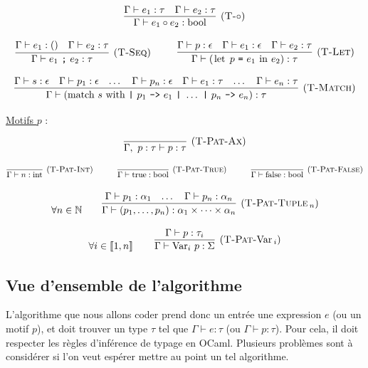 \documentclass[11pt]{article}
\begin{document}
\begin{definition}
    $$
    \infer[(\text{\scshape{T-$\circ$}})] 
    {\Gamma \vdash e_1\circ e_2:\text{bool}}
    {\Gamma \vdash e_1:\tau&\Gamma \vdash e_2:\tau}
    $$

    $$
    \infer[(\text{\scshape{T-Seq}})] 
    {\Gamma \vdash e_1~\texttt{;}~e_2:\tau}
    {\Gamma \vdash e_1:()&\Gamma\vdash e_2:\tau}
    ~~~~~~~~ 
    \infer[(\text{\scshape{T-Let}})] 
    {\Gamma \vdash (\text{\lstinline|let|}~p~\texttt{=}~e_1~\text{\lstinline|in|}~e_2):\tau}
    {
        \Gamma \vdash p:\epsilon
        &
        \Gamma \vdash e_1:\epsilon
        &
        \Gamma\vdash e_2:\tau
    }
    $$

    $$
    \infer[(\text{\scshape{T-Match}})] 
    {
        \Gamma \vdash (\text{\lstinline|match|}~s~\text{\lstinline|with|}~\texttt{|}~p_1~\texttt{->}~e_1~\texttt{|}~\dots~\texttt{|}~p_n~\texttt{->}~e_n):\tau
        }
    {
    \Gamma \vdash s:\epsilon
    &
    \Gamma \vdash p_1:\epsilon
    &
    \dots
    &
    \Gamma \vdash p_n:\epsilon
    &
    \Gamma\vdash e_1:\tau
    &
    \dots
    &
    \Gamma\vdash e_n:\tau
    }
    $$

    \underline{Motifs $p$} :

    $$
    \infer[(\text{\scshape{T-Pat-Ax}})] 
    {\Gamma,~p:\tau\vdash p:\tau}{}
    $$

    $$
    \infer[(\text{\scshape{T-Pat-Int}})] 
    {\Gamma\vdash n:\text{int}}{}
    ~~~~~~~~~
    \infer[(\text{\scshape{T-Pat-True}})] 
    {\Gamma\vdash \text{true}:\text{bool}}{}
    ~~~~~~~~~
    \infer[(\text{\scshape{T-Pat-False}})] 
    {\Gamma\vdash \text{false}:\text{bool}}{}
    $$

    $$
    \forall n\in\mathbb{N}~~~~~~
    \infer[(\text{\scshape{T-Pat-Tuple$\,_n$}})]
    {\Gamma\vdash (p_1, \dots, p_n) : \alpha_1\times\dots\times\alpha_n}
    {
        \Gamma\vdash p_1:\alpha_1&
        \dots&
        \Gamma\vdash p_n:\alpha_n
    }
    $$

    $$\forall i\in\left\llbracket1, n\right\rrbracket~~~~~~
    \infer[(\text{{\scshape{T-Pat-}}\text{Var}$\,_i$})]
    {\Gamma \vdash \text{Var}_i~p:\Sigma}
    {\Gamma \vdash p:\tau_i}
    $$
\end{definition}

\subsection{Vue d'ensemble de l'algorithme}

L'algorithme que nous allons coder prend donc un entrée une expression $e$ (ou un motif $p$), et doit trouver un type $\tau$ tel que $\Gamma\vdash e:\tau$ (ou $\Gamma\vdash p:\tau$). Pour cela, il doit respecter les règles d'inférence de typage en OCaml. Plusieurs problèmes sont à considérer si l'on veut espérer mettre au point un tel algorithme.
\end{document}

